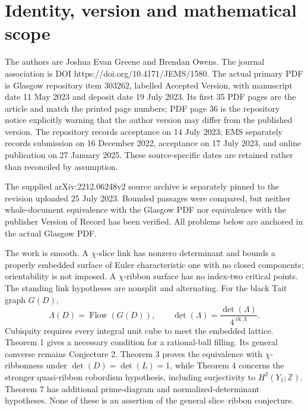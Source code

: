 \documentclass[10pt]{article}
\begin{document}
\section*{Identity, version and mathematical scope}
The authors are Joshua Evan Greene and Brendan Owens. The journal association is DOI https://doi.org/10.4171/JEMS/1580. The actual primary PDF is Glasgow repository item 303262, labelled Accepted Version, with manuscript date 11 May 2023 and deposit date 19 July 2023. Its first 35 PDF pages are the article and match the printed page numbers; PDF page 36 is the repository notice explicitly warning that the author version may differ from the published version. The repository records acceptance on 14 July 2023; EMS separately records submission on 16 December 2022, acceptance on 17 July 2023, and online publication on 27 January 2025. These source-specific dates are retained rather than reconciled by assumption.\par
The supplied arXiv:2212.06248v2 source archive is separately pinned to the revision uploaded 25 July 2023. Bounded passages were compared, but neither whole-document equivalence with the Glasgow PDF nor equivalence with the publisher Version of Record has been verified. All problems below are anchored in the actual Glasgow PDF.\par
The work is smooth. A \(\chi\)-slice link has nonzero determinant and bounds a properly embedded surface of Euler characteristic one with no closed components; orientability is not imposed. A \(\chi\)-ribbon surface has no index-two critical points. The standing link hypotheses are nonsplit and alternating. For the black Tait graph \(G(D)\), \[\Lambda(D)=\operatorname{Flow}(G(D)),\qquad
 \underline{\det}(\Lambda)=\frac{\det(\Lambda)}{4^{\operatorname{rk}\Lambda}}.
 \tag{1.1}\] Cubiquity requires every integral unit cube to meet the embedded lattice. Theorem 1 gives a necessary condition for a rational-ball filling. Its general converse remains Conjecture 2. Theorem 3 proves the equivalence with \(\chi\)-ribbonness under \(\underline{\det}(D)=\underline{\det}(L)=1\), while Theorem 4 concerns the stronger quasi-ribbon cobordism hypothesis, including surjectivity to \(H^2(Y_1;\mathbb Z)\). Theorem 7 has additional prime-diagram and normalized-determinant hypotheses. None of these is an assertion of the general slice–ribbon conjecture.\par
\end{document}
